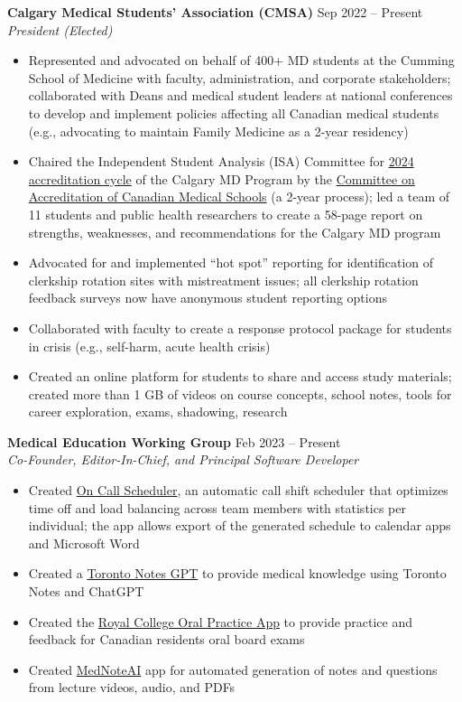\documentclass{article}
\begin{document}
\textbf{Calgary Medical Students' Association (CMSA)} \hfill Sep 2022 -- Present \\
\textit{President (Elected)}
\begin{itemize}
    \item Represented and advocated on behalf of 400+ MD students at the Cumming School of Medicine with faculty, administration, and corporate stakeholders; collaborated with Deans and medical student leaders at national conferences to develop and implement policies affecting all Canadian medical students (e.g., advocating to maintain Family Medicine as a 2-year residency)
    \item Chaired the Independent Student Analysis (ISA) Committee for \href{https://cumming.ucalgary.ca/about/ume-accreditation}{2024 accreditation cycle} of the Calgary MD Program by the \href{https://cacms-cafmc.ca/}{Committee on Accreditation of Canadian Medical Schools} (a 2-year process); led a team of 11 students and public health researchers to create a 58-page report on strengths, weaknesses, and recommendations for the Calgary MD program
    \item Advocated for and implemented ``hot spot'' reporting for identification of clerkship rotation sites with mistreatment issues; all clerkship rotation feedback surveys now have anonymous student reporting options
    \item Collaborated with faculty to create a response protocol package for students in crisis (e.g., self-harm, acute health crisis)
    \item Created an online platform for students to share and access study materials; created more than 1 GB of videos on course concepts, school notes, tools for career exploration, exams, shadowing, research
\end{itemize} \vspace{1em}

\textbf{Medical Education Working Group} \hfill Feb 2023 -- Present \\
\textit{Co-Founder, Editor-In-Chief, and Principal Software Developer}
\begin{itemize}
    \item Created \href{https://oncallscheduler.netlify.app/}{On Call Scheduler}, an automatic call shift scheduler that optimizes time off and load balancing across team members with statistics per individual; the app allows export of the generated schedule to calendar apps and Microsoft Word
    \item Created a \href{https://chat.openai.com/g/g-cewxRzfa6-toronto-notes}{Toronto Notes GPT} to provide medical knowledge using Toronto Notes and ChatGPT
    \item Created the \href{https://github.com/tig3r66/royal-college-practice}{Royal College Oral Practice App} to provide practice and feedback for Canadian residents oral board exams
    \item Created \href{https://github.com/tig3r66/mednoteai}{MedNoteAI} app for automated generation of notes and questions from lecture videos, audio, and PDFs
\end{itemize} \vspace{1em}
\end{document}
